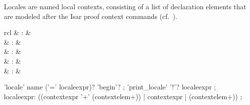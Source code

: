 \begin{isabellebody}
\begin{isamarkuptext}
\begin{description}
  \end{description}%
\end{isamarkuptext}%
\isamarkuptrue%
%
\isamarkuptrue%
%
\begin{isamarkuptext}%
Locales are named local contexts, consisting of a list of
  declaration elements that are modeled after the Isar proof context
  commands (cf.\ ).%
\end{isamarkuptext}%
\isamarkuptrue%
%
\isamarkuptrue%
%
\begin{isamarkuptext}%
\begin{matharray}{rcl}
    \hypertarget{command.locale}{\hyperlink{command.locale}{\mbox{}}} & : &  \\
    \hypertarget{command.print-locale}{\hyperlink{command.print-locale}{\mbox{}}}\isa{{\isachardoublequote}\isactrlsup {\isacharasterisk}{\isachardoublequote}} & : &  \\
    \hypertarget{command.print-locales}{\hyperlink{command.print-locales}{\mbox{}}}\isa{{\isachardoublequote}\isactrlsup {\isacharasterisk}{\isachardoublequote}} & : &  \\
    \hypertarget{method.intro-locales}{\hyperlink{method.intro-locales}{\mbox{}}} & : &  \\
    \hypertarget{method.unfold-locales}{\hyperlink{method.unfold-locales}{\mbox{}}} & : &  \\
  \end{matharray}

  \begin{rail}
    'locale' name ('=' localeexpr)? 'begin'?
    ;
    'print\_locale' '!'? localeexpr
    ;
    localeexpr: ((contextexpr '+' (contextelem+)) | contextexpr | (contextelem+))
    ;


\end{rail}
\end{isamarkuptext}
\end{isabellebody}
